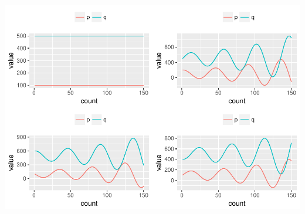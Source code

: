\documentclass[]{article}
\begin{document}
\includegraphics{CHunt_homework1_files/figure-latex/unnamed-chunk-6-1.pdf}
\end{document}
